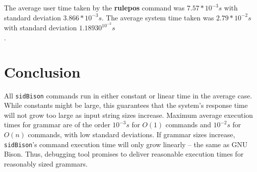 \noindent

The average user time taken by the \textbf{rulepos} command was $7.57 * 10^{-3} s$ with standard deviation $3.866 * 10^{-3} s$. The average system time taken was $2.79 * 10^{-2} s$ with standard deviation $1.18930 ^ 10^{-3} s$\\.

\section{Conclusion}

All \verb|sidBison| commands run in either constant or linear time in the average case. While constants might be large, this guarantees that the system's response time will not grow too large as input string sizes increase. Maximum average execution times for grammar are of the order $10^{-3} s$  for $O(1)$ commands and $10^{-2} s$ for $O(n)$ commands, with low standard deviations. If grammar sizes increase, \verb|sidBison|'s command execution time will only grow linearly -- the same as GNU Bison. Thus, debugging tool promises to deliver reasonable execution times for reasonably sized grammars. 

